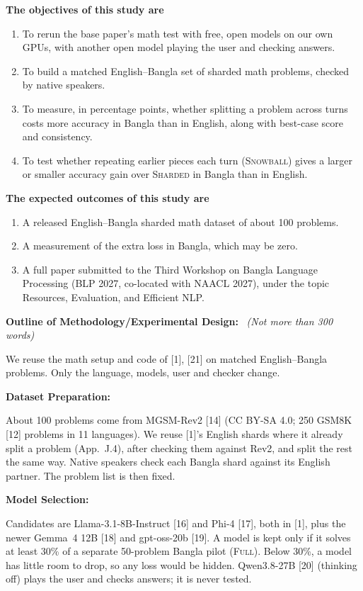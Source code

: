 \documentclass[11pt,a4paper]{article}
\newcommand{\formitem}[3]{%
  \par\vspace{4pt}\noindent\makebox[1.6em][l]{\textbf{#1.}}\textbf{#2}%
  \if\relax\detokenize{#3}\relax\else\ \textit{(#3)}\fi\par}
\newcommand{\subhead}[1]{\par\needspace{3\baselineskip}\vspace{2pt}\textbf{#1}\par\vspace{-3pt}}
\begin{document}
\textbf{The objectives of this study are}
\begin{enumerate}[leftmargin=2em,itemsep=1pt,topsep=2pt]
\item To rerun the base paper's math test with free, open models on our own GPUs, with another open model playing the user and checking answers.
\item To build a matched English--Bangla set of sharded math problems, checked by native speakers.
\item To measure, in percentage points, whether splitting a problem across turns costs more accuracy in Bangla than in English, along with best-case score and consistency.
\item To test whether repeating earlier pieces each turn (\textsc{Snowball}) gives a larger or smaller accuracy gain over \textsc{Sharded} in Bangla than in English.
\end{enumerate}

\textbf{The expected outcomes of this study are}
\begin{enumerate}[leftmargin=2em,itemsep=1pt,topsep=2pt]
\item A released English--Bangla sharded math dataset of about 100 problems.
\item A measurement of the extra loss in Bangla, which may be zero.
\item A full paper submitted to the Third Workshop on Bangla Language Processing (BLP 2027, co-located with NAACL 2027), under the topic Resources, Evaluation, and Efficient NLP.
\end{enumerate}

\formitem{10}{Outline of Methodology/Experimental Design:}{Not more than 300 words}

We reuse the math setup and code of [1], [21] on matched English--Bangla problems. Only the language, models, user and checker change.

\subhead{Dataset Preparation:}
About 100 problems come from MGSM-Rev2 [14] (CC BY-SA 4.0; 250 GSM8K [12] problems in 11 languages). We reuse [1]'s English shards where it already split a problem (App.~J.4), after checking them against Rev2, and split the rest the same way. Native speakers check each Bangla shard against its English partner. The problem list is then fixed.
\figdata

\subhead{Model Selection:}
Candidates are Llama-3.1-8B-Instruct [16] and Phi-4 [17], both in [1], plus the newer Gemma~4 12B [18] and gpt-oss-20b [19]. A model is kept only if it solves at least 30\% of a separate 50-problem Bangla pilot (\textsc{Full}). Below 30\%, a model has little room to drop, so any loss would be hidden. Qwen3.8-27B [20] (thinking off) plays the user and checks answers; it is never tested.
\figmodels
\end{document}
